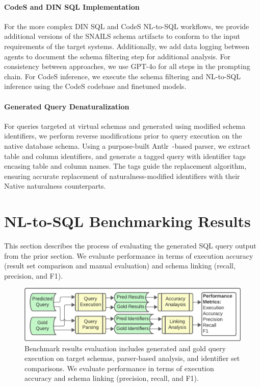 \paragraph{\textbf{CodeS and DIN SQL Implementation}}
For the more complex DIN SQL and CodeS NL-to-SQL workflows, we provide additional versions of the SNAILS schema artifacts to conform to the input requirements of the target systems.
Additionally, we add data logging between agents to document the schema filtering step for additional analysis.
For consistency between approaches, we use GPT-4o for all steps in the prompting chain.
For CodeS inference, we execute the schema filtering and NL-to-SQL inference using the CodeS codebase and finetuned models.

\paragraph{\textbf{Generated Query Denaturalization}}
For queries targeted at virtual schemas and generated using modified schema identifiers, we perform reverse modifications prior to query execution on the native database schema.
Using a purpose-built Antlr~\cite{Parr2014}-based parser, we extract table and column identifiers, and generate a tagged query with identifier tags encasing table and column names.
The tags guide the replacement algorithm, ensuring accurate replacement of naturalness-modified identifiers with their Native naturalness counterparts.


\section{NL-to-SQL Benchmarking Results}

\label{section:nl-to-sql-benchmarking-results}

This section describes the process of evaluating the generated SQL query output from the prior section.
We evaluate performance in terms of execution accuracy (result set comparison and manual evaluation) and schema linking (recall, precision, and F1).

\begin{figure}[!h]
  \centering
  \includegraphics[width=\figwidthmod\linewidth]{figures/section-6-process-header.pdf}
  \caption{Benchmark results evaluation includes generated and gold query execution on target schemas, parser-based analysis, and identifier set comparisons. We evaluate performance in terms of execution accuracy and schema linking (precision, recall, and F1).}
\end{figure}

